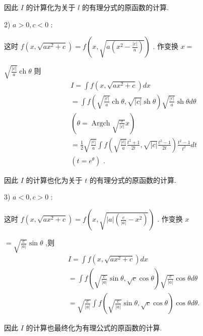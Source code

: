 因此 $I$ 的计算化为关于 $l$ 的有理分式的原函数的计算.

2) $a > 0,c < 0$ :

这时 $f\left( {x,\sqrt{a{x}^{2} + c}}\right)  = f\left( {x,\sqrt{a\left( {{x}^{2} - \frac{\left| c\right| }{a}}\right) }}\right)$ . 作变换 $x =$

$\sqrt{\frac{\left| c\right| }{a}}\operatorname{ch}\theta$ 则
\begin{align*}
	&I = \int f\left( {x,\sqrt{a{x}^{2} + c}}\right) {dx}\\
	&= \int f\left( {\sqrt{\frac{\left| c\right| }{a}}\operatorname{ch}\theta ,\sqrt{\left| c\right| }\operatorname{sh}\theta }\right) \sqrt{\frac{\left| c\right| }{a}}\operatorname{sh}{\theta d\theta }\\
	&\left( {\theta  = \operatorname{Argch}\sqrt{\frac{\sigma }{\left| c\right| }}x}\right)\\
	&= \frac{1}{2}\sqrt{\frac{\left| c\right| }{a}}\int f\left( {\sqrt{\frac{\left| c\right| }{a}}\frac{{t}^{2} + 1}{2t},\sqrt{\left| c\right| }\frac{{t}^{2} - 1}{2t}}\right) \frac{{t}^{2} - 1}{{t}^{2}}{dt}\\
	&\left( {t = {e}^{\theta }}\right) \text{ . }
\end{align*}

因此 $I$ 的计算也化为关于 $t$ 的有理分式的原函数的计算.

3) $a < 0,c > 0$ :

这时 $f\left( {x,\sqrt{a{x}^{2} + c}}\right)  = f\left( {x,\sqrt{\left| a\right| \left( {\frac{c}{\left| a\right| } - {x}^{2}}\right) }}\right)$ . 作变换 $x$

$= \sqrt{\frac{c}{\left| a\right| }}\sin \theta$ ,则
\begin{align*}
	&I = \int f\left( {x,\sqrt{a{x}^{2} + c}}\right) {dx}\\
	&= \int f\left( {\sqrt{\frac{c}{\left| a\right| }}\sin \theta ,\sqrt{c}\cos \theta }\right) \sqrt{\frac{c}{\left| a\right| }}\cos {\theta d\theta }\\
	&= \sqrt{\frac{c}{\left| a\right| }}\int f\left( {\sqrt{\frac{c}{\left| a\right| }}\sin \theta ,\sqrt{c}\cos \theta }\right) \cos {\theta d\theta }.
\end{align*}

因此 $I$ 的计算也最终化为有理公式的原函数的计算.

